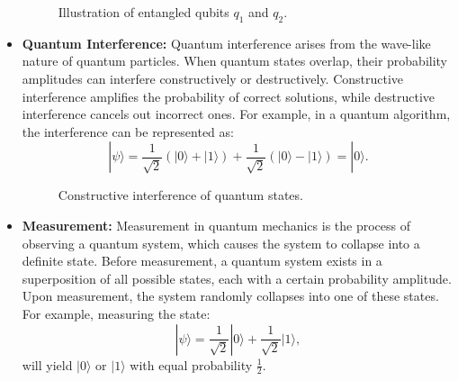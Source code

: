 \documentclass[12pt,a4paper]{report}
\begin{document}
\begin{itemize}
    \begin{figure}[H]
        \centering
        \caption{Illustration of entangled qubits \( q_1 \) and \( q_2 \).}
    \end{figure}

    \item \textbf{Quantum Interference:} 
    Quantum interference arises from the wave-like nature of quantum particles. When quantum states overlap, their probability amplitudes can interfere constructively or destructively. Constructive interference amplifies the probability of correct solutions, while destructive interference cancels out incorrect ones. For example, in a quantum algorithm, the interference can be represented as:
    \[
    |\psi\rangle = \frac{1}{\sqrt{2}} \left( |0\rangle + |1\rangle \right) + \frac{1}{\sqrt{2}} \left( |0\rangle - |1\rangle \right) = |0\rangle.
    \]

    \begin{figure}[H]
        \centering
        \caption{Constructive interference of quantum states.}
    \end{figure}

    \item \textbf{Measurement:} 
    Measurement in quantum mechanics is the process of observing a quantum system, which causes the system to collapse into a definite state. Before measurement, a quantum system exists in a superposition of all possible states, each with a certain probability amplitude. Upon measurement, the system randomly collapses into one of these states. For example, measuring the state:
    \[
    |\psi\rangle = \frac{1}{\sqrt{2}} |0\rangle + \frac{1}{\sqrt{2}} |1\rangle,
    \]
    will yield \( |0\rangle \) or \( |1\rangle \) with equal probability \( \frac{1}{2} \).


\end{itemize}
\end{document}

